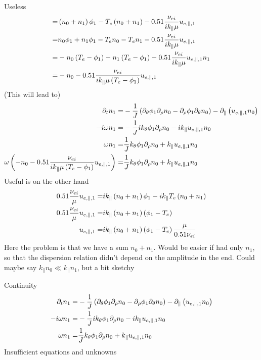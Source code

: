 Useless
%
\begin{align*}
=&
\left( n_0 + n_1\right) \phi_1
- T_e \left( n_0 + n_1 \right)
- 0.51 \frac{\nu_{ei}}{ik_\|\mu }  u_{e,\|,1}
  \\
=&
n_0 \phi_1+ n_1 \phi_1
- T_e  n_0 - T_e n_1
- 0.51 \frac{\nu_{ei}}{ik_\|\mu }  u_{e,\|,1}
  \\
=&
- n_0 \left(T_e - \phi_1\right)
- n_1 \left(T_e - \phi_1\right)
- 0.51 \frac{\nu_{ei}}{ik_\|\mu }  u_{e,\|,1}
  n_1
  \\
=&
- n_0
- 0.51 \frac{\nu_{ei}}{ik_\|\mu \left(T_e - \phi_1\right) }  u_{e,\|,1}
\end{align*}
%
(This will lead to)
%
\begin{align*}
 \partial_t n_1
=&
 -\frac{1}{J}\left(
  \partial_\theta\phi_1\partial_\rho n_0
 - \partial_\rho\phi_1\partial_\theta n_0
 \right)
 -  \partial_\| \left(u_{e,\|,1} n_0 \right)
 \\
 -i\omega n_1
=&
 -\frac{1}{J} ik_\theta\phi_1\partial_\rho n_0
 - ik_\|u_{e,\|,1} n_0
 \\
 \omega n_1
=&
 \frac{1}{J} k_\theta\phi_1\partial_\rho n_0
 + k_\|u_{e,\|,1} n_0
 \\
 \omega
 \left(
- n_0
- 0.51 \frac{\nu_{ei}}{ik_\|\mu \left(T_e - \phi_1\right) }  u_{e,\|,1}
 \right)
=&
 \frac{1}{J} k_\theta\phi_1\partial_\rho n_0
 + k_\|u_{e,\|,1} n_0
\end{align*}
%
Useful is on the other hand
%
\begin{align*}
    0.51 \frac{\nu_{ei}}{\mu }  u_{e,\|,1}
=&
ik_\|\L( n_0 + n_1\R) \phi_1
- ik_\|T_e \L( n_0 + n_1 \R)
\\
%
    0.51 \frac{\nu_{ei}}{\mu }  u_{e,\|,1}
=&
ik_\|\L( n_0 + n_1\R) \L(\phi_1 -T_e \R)
\\
%
     u_{e,\|,1}
=&
ik_\|\L( n_0 + n_1\R) \L(\phi_1 -T_e \R)
     \frac{\mu}{0.51\nu_{ei} }
\end{align*}
%
Here the problem is that we have a sum $n_0 + n_1$.
Would be easier if had only $n_1$, so that the dispersion relation didn't depend on the amplitude in the end.
Could maybe say $k_\|n_0 \ll k_\|n_1$, but a bit sketchy

Continuity
%
\begin{align*}
 \partial_t n_1
=&
 -\frac{1}{J}\left(
  \partial_\theta\phi_1\partial_\rho n_0
 - \partial_\rho\phi_1\partial_\theta n_0
 \right)
 -  \partial_\| \left(u_{e,\|,1} n_0 \right)
 \\
 -i\omega n_1
=&
 -\frac{1}{J} ik_\theta\phi_1\partial_\rho n_0
 - ik_\|u_{e,\|,1} n_0
 \\
 \omega n_1
=&
 \frac{1}{J} k_\theta\phi_1\partial_\rho n_0
 + k_\|u_{e,\|,1} n_0
\end{align*}
%
Insufficient equations and unknowns
